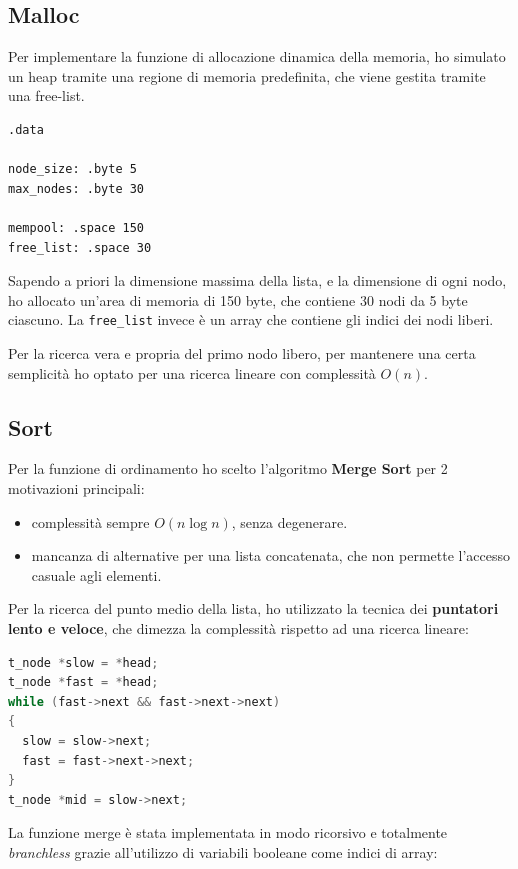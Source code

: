 \documentclass[a4paper,12pt]{article}
\begin{document}
\subsection{Malloc}

Per implementare la funzione di allocazione dinamica della memoria, ho simulato un heap tramite una regione di memoria predefinita, che viene gestita tramite una free-list.

\begin{lstlisting}[language=riscv]
.data

node_size: .byte 5
max_nodes: .byte 30

mempool: .space 150
free_list: .space 30
\end{lstlisting}

Sapendo a priori la dimensione massima della lista, e la dimensione di ogni nodo, ho allocato un'area di memoria di 150 byte, che contiene 30 nodi da 5 byte ciascuno.
La \texttt{free\_list} invece è un array che contiene gli indici dei nodi liberi.

Per la ricerca vera e propria del primo nodo libero, per mantenere una certa semplicità ho optato per una ricerca lineare con complessità $O(n)$.

\subsection{Sort}

Per la funzione di ordinamento ho scelto l'algoritmo \textbf{Merge Sort} per 2 motivazioni principali:
\begin{itemize}
    \item complessità sempre $O(n \log n)$, senza degenerare.
    \item mancanza di alternative per una lista concatenata, che non permette l'accesso casuale agli elementi.
\end{itemize}

Per la ricerca del punto medio della lista, ho utilizzato la tecnica dei \textbf{puntatori lento e veloce}, che dimezza la complessità rispetto ad una ricerca lineare:

\begin{lstlisting}[language=C]
t_node *slow = *head;
t_node *fast = *head;
while (fast->next && fast->next->next)
{
  slow = slow->next;
  fast = fast->next->next;
}
t_node *mid = slow->next;
\end{lstlisting}

La funzione merge è stata implementata in modo ricorsivo e totalmente \emph{branchless} grazie all'utilizzo di variabili booleane come indici di array:
\end{document}
